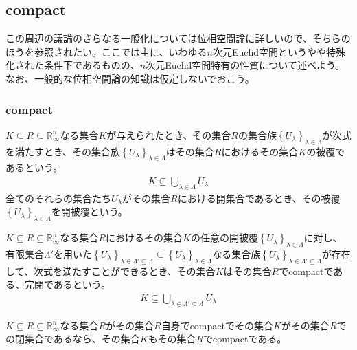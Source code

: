 \documentclass[dvipdfmx]{jsarticle}
\begin{document}
\subsection{compact}%
この周辺の議論のさらなる一般化については位相空間論に詳しいので、そちらのほうを参照されたい。ここでは主に、いわゆる$n$次元Euclid空間というやや特殊化された条件下であるものの、$n$次元Euclid空間特有の性質について述べよう。なお、一般的な位相空間論の知識は仮定しないでおこう。
\subsubsection{compact}%
\begin{dfn}
$K \subseteq R \subseteq \mathbb{R}_{\infty}^{n}$なる集合$K$が与えられたとき、その集合$R$の集合族$\left\{ U_{\lambda} \right\}_{\lambda \in \varLambda}$が次式を満たすとき、その集合族$\left\{ U_{\lambda} \right\}_{\lambda \in \varLambda}$はその集合$R$におけるその集合$K$の被覆であるという。
\begin{align*}
K \subseteq \bigcup_{\lambda \in \varLambda} U_{\lambda}
\end{align*}
全てのそれらの集合たち$U_{\lambda}$がその集合$R$における開集合であるとき、その被覆$\left\{ U_{\lambda} \right\}_{\lambda \in \varLambda}$を開被覆という。
\end{dfn}
\begin{dfn}
$K \subseteq R \subseteq \mathbb{R}_{\infty}^{n}$なる集合$R$におけるその集合$K$の任意の開被覆$\left\{ U_{\lambda} \right\}_{\lambda \in \varLambda}$に対し、有限集合$\varLambda'$を用いた$\left\{ U_{\lambda} \right\}_{\lambda \in \varLambda' \subseteq \varLambda } \subseteq \left\{ U_{\lambda} \right\}_{\lambda \in \varLambda}$なる集合族$\left\{ U_{\lambda} \right\}_{\lambda \in \varLambda' \subseteq \varLambda }$が存在して、次式を満たすことができるとき、その集合$K$はその集合$R$でcompactである、完閉であるという。
\begin{align*}
K \subseteq \bigcup_{\lambda \in \varLambda' \subseteq \varLambda } U_{\lambda}
\end{align*}
\end{dfn}
\begin{thm}\label{4.1.7.1}
$K \subseteq R \subseteq \mathbb{R}_{\infty}^{n}$なる集合$R$がその集合$R$自身でcompactでその集合$K$がその集合$R$での閉集合であるなら、その集合$K$もその集合$R$でcompactである。
\end{thm}
\end{document}
